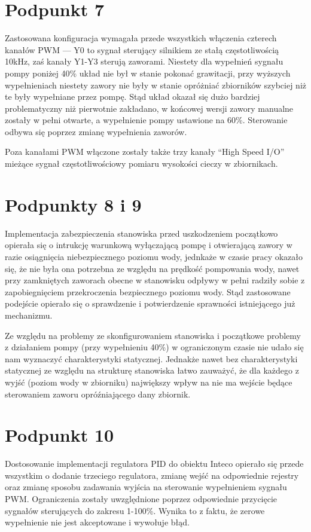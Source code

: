 \chapter{Podpunkt 7}
Zastosowana konfiguracja wymagała przede wszystkich włączenia czterech kanałów PWM --- Y0 to sygnał sterujący silnikiem ze stałą częstotliwością 10kHz, zaś kanały Y1-Y3 sterują zaworami. Niestety dla wypełnień sygnału pompy poniżej 40\% układ nie był w stanie pokonać grawitacji, przy wyższych wypełnieniach niestety zawory nie były w stanie opróżniać zbiorników szybciej niż te były wypełniane przez pompę. Stąd układ okazał się dużo bardziej problematyczny niż pierwotnie zakładano, w końcowej wersji zawory manualne zostały w pełni otwarte, a wypełnienie pompy ustawione na 60\%. Sterowanie odbywa się poprzez zmianę wypełnienia zaworów.

Poza kanałami PWM włączone zostały także trzy kanały ``High Speed I/O'' mieżące sygnał częstotliwościowy pomiaru wysokości cieczy w zbiornikach.

\chapter{Podpunkty 8 i 9}
Implementacja zabezpieczenia stanowiska przed uszkodzeniem początkowo opierała się o intrukcję warunkową wyłączającą pompę i otwierającą zawory w razie osiągnięcia niebezpiecznego poziomu wody, jednkaże w czasie pracy okazało się, że nie była ona potrzebna ze względu na prędkość pompowania wody, nawet przy zamkniętych zaworach obecne w stanowisku odpływy w pełni radziły sobie z zapobiegnięciem przekroczenia bezpiecznego poziomu wody. Stąd zastosowane podejście opierało się o sprawdzenie i potwierdzenie sprawności istniejącego już mechanizmu.

Ze względu na problemy ze skonfigurowaniem stanowiska i początkowe problemy z działaniem pompy (przy wypełnieniu 40\%) w ograniczonym czasie nie udało się nam wyznaczyć charakterystyki statycznej. Jednakże nawet bez charakterystyki statycznej ze względu na strukturę stanowiska łatwo zauważyć, że dla każdego z wyjść (poziom wody w zbiorniku) największy wpływ na nie ma wejście będące sterowaniem zaworu opróźniającego dany zbiornik.

\chapter{Podpunkt 10}
Dostosowanie implementacji regulatora PID do obiektu Inteco opierało się przede wszystkim o dodanie trzeciego regulatora, zmianę wejść na odpowiednie rejestry oraz zmianę sposobu zadawania wyjścia na sterowanie wypełnieniem sygnału PWM. Ograniczenia zostały uwzględnione poprzez odpowiednie przycięcie sygnałów sterujących do zakresu 1-100\%. Wynika to z faktu, że zerowe wypełnienie nie jest akceptowane i wywołuje błąd.

